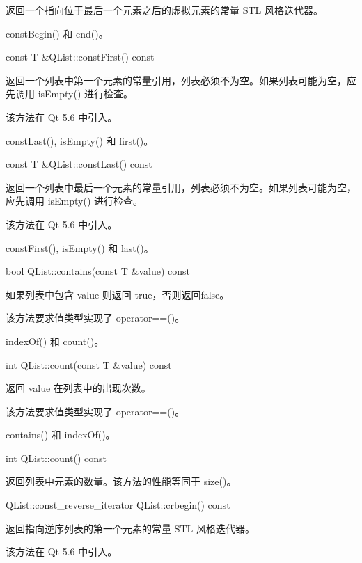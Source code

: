 返回一个指向位于最后一个元素之后的虚拟元素的常量 STL 风格迭代器。




\begin{seeAlso}
constBegin() 和 end()。
\end{seeAlso}


const T \&QList::constFirst() const

返回一个列表中第一个元素的常量引用，列表必须不为空。如果列表可能为空，应先调用 isEmpty() 进行检查。

该方法在 Qt 5.6 中引入。

\begin{seeAlso}
constLast(), isEmpty() 和 first()。
\end{seeAlso}


const T \&QList::constLast() const

返回一个列表中最后一个元素的常量引用，列表必须不为空。如果列表可能为空，应先调用 isEmpty() 进行检查。

该方法在 Qt 5.6 中引入。




\begin{seeAlso}
constFirst(), isEmpty() 和 last()。
\end{seeAlso}


bool QList::contains(const T \&value) const

如果列表中包含 value 则返回 true，否则返回false。

该方法要求值类型实现了 operator==()。

\begin{seeAlso}
indexOf() 和 count()。
\end{seeAlso}

int QList::count(const T \&value) const

返回 value 在列表中的出现次数。

该方法要求值类型实现了 operator==()。



\begin{seeAlso}
contains() 和 indexOf()。
\end{seeAlso}


int QList::count() const

返回列表中元素的数量。该方法的性能等同于 size()。

QList::const\_reverse\_iterator QList::crbegin() const

返回指向逆序列表的第一个元素的常量 STL 风格迭代器。

该方法在 Qt 5.6 中引入。

